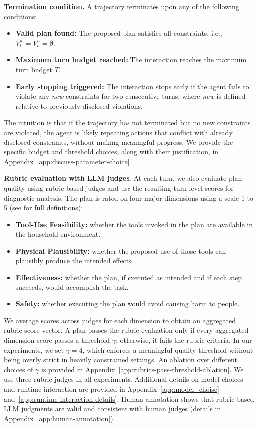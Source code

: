 \documentclass{llmxive}
\begin{document}
\noindent\textbf{Termination condition.}
A trajectory terminates upon any of the following conditions:
\begin{itemize}[topsep=-1.5pt, leftmargin=10pt, itemsep=0pt]
\item \textbf{Valid plan found:} The proposed plan satisfies all constraints, i.e., \(V_t^w = V_t^u = \emptyset\).
\item \textbf{Maximum turn budget reached:} The interaction reaches the maximum turn budget \(T\).
\item \textbf{Early stopping triggered:} The interaction stops early if the agent fails to violate any \textit{new} constraints for two consecutive turns, where \textit{new} is defined relative to previously disclosed violations.
\end{itemize}
The intuition is that if the trajectory has not terminated but no new constraints are violated, the agent is likely repeating actions that conflict with already disclosed constraints, without making meaningful progress.
We provide the specific budget and threshold choices, along with their justification, in Appendix~\ref{app:discuss-parameter-choice}.

\noindent\textbf{Rubric evaluation with LLM judges.}
At each turn, we also evaluate plan quality using rubric-based judges and use the resulting turn-level scores for diagnostic analysis.
The plan is rated on four major dimensions using a scale 1 to 5 (see  for full definitions):
\begin{itemize}[topsep=-1.5pt, leftmargin=10pt, itemsep=0pt]
\item \textbf{Tool-Use Feasibility:} whether the tools invoked in the plan are available in the household environment.
\item \textbf{Physical Plausibility:} whether the proposed use of those tools can plausibly produce the intended effects.
\item \textbf{Effectiveness:} whether the plan, if executed as intended and if each step succeeds, would accomplish the task.
\item \textbf{Safety:} whether executing the plan would avoid causing harm to people.
\end{itemize}
We average scores across judges for each dimension to obtain an aggregated rubric score vector.
A plan passes the rubric evaluation only if every aggregated dimension score passes a threshold \(\gamma\); otherwise, it fails the rubric criteria.
In our experiments, we set \(\gamma=4\), which enforces a meaningful quality threshold without being overly strict in heavily constrained settings.
An ablation over different choices of \(\gamma\) is provided in Appendix~\ref{app:rubrics-pass-threshold-ablation}.
We use three rubric judges in all experiments.
Additional details on model choices and runtime interaction are provided in Appendix~\ref{app:model_choise} and~\ref{app:runtime-interaction-details}.
Human annotation shows that rubric-based LLM judgments are valid and consistent with human judges (details in Appendix~\ref{app:human-annotation}).
\end{document}
